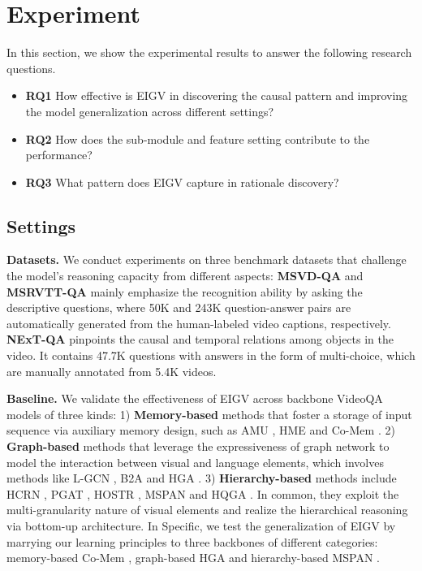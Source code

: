 \section{Experiment}
\label{sec:experiment}

In this section, we show the experimental results to answer the following research questions.
\begin{itemize}[leftmargin=*]
\item \textbf{RQ1} How effective is EIGV in discovering the causal pattern and improving the model generalization across different settings?
\item \textbf{RQ2} How does the sub-module and feature setting contribute to the performance?
\item \textbf{RQ3} What pattern does EIGV capture in rationale discovery?
\end{itemize}

\subsection{Settings}

\vspace{5pt}
\noindent \textbf{Datasets.} We conduct experiments on three benchmark datasets that challenge the model's reasoning capacity from different aspects: 
\textbf{MSVD-QA}  \cite{DBLP:conf/mm/XuZX0Z0Z17} and \textbf{MSRVTT-QA} \cite{DBLP:conf/mm/XuZX0Z0Z17} mainly emphasize the recognition ability by asking the descriptive questions, where 50K and 243K question-answer pairs are automatically generated from the human-labeled video captions, respectively.
\textbf{NExT-QA} \cite{DBLP:conf/cvpr/XiaoSYC21} pinpoints the causal and temporal relations among objects in the video. It contains 47.7K questions with answers in the form of multi-choice, which are manually annotated from 5.4K videos.

\vspace{5pt}
\noindent\textbf{Baseline.} We validate the effectiveness of EIGV across backbone VideoQA models of three kinds: 
1) \textbf{Memory-based} methods that foster a storage of input sequence via auxiliary memory design, such as AMU \cite{DBLP:conf/mm/XuZX0Z0Z17}, HME \cite{fan2019heterogeneous} and Co-Mem \cite{gao2018motionappearance}.
2) \textbf{Graph-based} methods that leverage the expressiveness of graph network to model the interaction between visual and language elements, which involves methods like L-GCN \cite{huang2020locationaware}, B2A  \cite{park2021bridge} and HGA \cite{jiang2020reasoning}. 
3) \textbf{Hierarchy-based} methods include HCRN \cite{le2021hierarchical}, PGAT \cite{DBLP:conf/mm/PengYBW21}, HOSTR \cite{dang2021hierarchical}, MSPAN \cite{DBLP:conf/acl/GuoZJ0L20} and HQGA \cite{xiao2021video}. In common, they exploit the multi-granularity nature of visual elements and realize the hierarchical reasoning via bottom-up architecture. 
In Specific, we test the generalization of EIGV by marrying our learning principles to three backbones of different categories: memory-based Co-Mem \cite{gao2018motionappearance}, graph-based HGA \cite{jiang2020reasoning} and hierarchy-based MSPAN \cite{DBLP:conf/acl/GuoZJ0L20}. 

